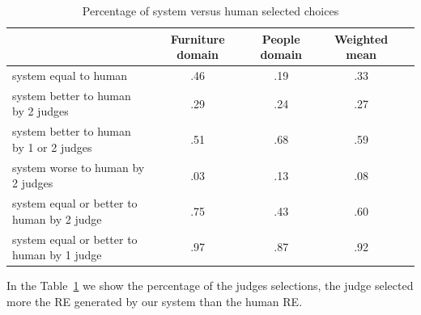 \begin{table}[h!]
\begin{center}
\begin{tabular}{|l|c|c|c|c|}
\hline
 & Furniture domain & People domain & Weighted mean \\
\hline
system equal to human  	&	.46	&	.19	&	.33 \\
system better to human by 2 judges &	.29 	& 	.24 	& 	.27 \\
system better to human by 1 or 2 judges & .51	&	.68	&	.59 \\
system worse to human by 2 judges &	.03	&	.13	&	.08 \\
system equal or better to human by 2 judge  &.75  &       .43	&       .60 \\
system equal or better to human by 1 judge  &.97	&	.87	&	.92 \\
\hline
\end{tabular}
\caption{Percentage of system versus human selected choices} 
\label{system-versus-human}
\end{center}
\end{table}
In the Table~\ref{system-versus-human} we show the percentage of the judges selections, the judge selected more the RE generated by our system than the human RE.



